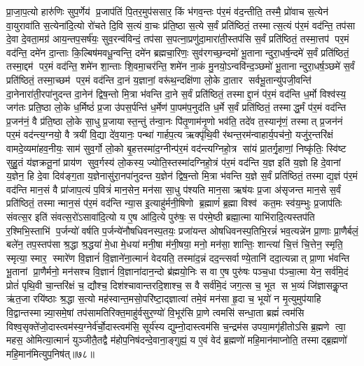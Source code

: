 प्रा॒जा॒प॒त्यो हारु॑णिः सुप॒र्णेय॑ प्र॒जाप॑तिं पि॒तर॒मुप॑ससार॒ किं भ॑गव॒न्तः प॑र॒मं व॑द॒न्तीति॒ तस्मै॒ प्रो॑वाच स॒त्येन॑ वा॒युरावा॑ति स॒त्येना॑दि॒त्यो रो॑चते दि॒वि स॒त्यं वा॒चः प्र॑ति॒ष्ठा स॒त्ये स॒र्वं प्रति॑ष्ठितं॒ तस्मात्स॒त्यं प॑र॒मं वद॑न्ति॒ तप॑सा दे॒वा दे॒वता॒मग्र॑ आय॒न्तप॒सर्\mbox{}ष॑यः॒ सुव॒रन्व॑विन्दं॒ तप॑सा स॒पत्ना॒प्रणु॑दा॒मारा॑ती॒स्तप॑सि स॒र्वं प्रति॑ष्ठितं॒ तस्मा॒त्तप॑ पर॒मं वद॑न्ति॒ दमे॑न दा॒न्ताः कि॒ल्बिष॑मवधू॒न्वन्ति॒ दमे॑न ब्रह्मचा॒रिणः॒ सुव॑रगच्छ॒न्दमो॑ भू॒तानान्दुरा॒धर्\mbox{}ष॒न्दमे॑ स॒र्वं प्रति॑ष्ठितं॒ तस्मा॒द्दम॑ पर॒मं वद॑न्ति॒ शमे॑न शा॒न्ताः  शि॒वमा॒चर॑न्ति॒ शमे॑न ना॒कं मु॒नयो॒ऽन्ववि॑न्द॒ञ्छमो॑ भू॒तानान्दुरा॒धर्\mbox{}ष॒ञ्छमे॑ स॒र्वं प्रति॑ष्ठितं॒ तस्मा॒च्छम॑ पर॒मं वद॑न्ति दा॒नं य॒ज्ञानां॒ वरू॑थ॒न्दक्षि॑णा लो॒के दा॒तार सर्वभू॒तान्यु॑पजी॒वन्ति॑ दा॒नेनारा॑ती॒रपा॑नुदन्त दा॒नेन॑ द्विष॒न्तो मि॒त्रा भ॑वन्ति दा॒ने स॒र्वं प्रति॑ष्ठितं॒ तस्माद्दा॒नं प॑र॒मं वद॑न्ति ध॒र्मो विश्व॑स्य॒ जग॑तः प्रति॒ष्ठा लो॒के ध॒र्मिष्ठं॑ प्र॒जा उ॑पस॒र्पन्ति॑ ध॒र्मेण॑ पा॒पम॑प॒नुद॑ति ध॒र्मे स॒र्वं प्रति॑ष्ठितं॒ तस्माद्ध॒र्मं प॑र॒मं वद॑न्ति प्र॒जन॑नं॒ वै प्र॑ति॒ष्ठा लो॒के सा॒धु प्र॒जायास्त॒न्तुं त॑न्वा॒नः पि॑तृ॒णाम॑नृ॒णो भव॑ति॒ तदे॑व त॒स्यानृ॑णं॒ तस्मात् प्र॒जन॑नं पर॒मं वद॑न्त्य॒ग्नयो॒ वै त्रयी॑ वि॒द्या दे॑व॒यानः॒ पन्था॑ गार्\mbox{}हप॒त्य ऋक्पृ॑थि॒वी र॑थन्त॒रम॑न्वाहार्य॒पच॑नो॒ यजु॑र॒न्तरि॑क्षं वामदे॒व्यमा॑हव॒नीयः॒ साम॑ सुव॒र्गो लो॒को बृ॒हत्तस्मा॑द॒ग्नीन्प॑र॒मं वद॑न्त्यग्निहो॒त्र सा॑यं प्रा॒तर्गृ॒हाणां॒ निष्कृ॑तिः॒ स्वि॑ष्ट सुहु॒तं य॑ज्ञक्रतू॒नां प्राय॑ण सुव॒र्गस्य॑ लो॒कस्य॒ ज्योति॒स्तस्मा॑दग्निहो॒त्रं प॑र॒मं वद॑न्ति य॒ज्ञ इति॑ य॒ज्ञो हि दे॒वानां य॒ज्ञेन॒ हि दे॒वा दिव॑ङ्ग॒ता य॒ज्ञेनासु॑रा॒नपा॑नुदन्त य॒ज्ञेन॑ द्विष॒न्तो मि॒त्रा भ॑वन्ति य॒ज्ञे स॒र्वं प्रति॑ष्ठितं॒ तस्माद्य॒ज्ञं प॑र॒मं वद॑न्ति मान॒सं वै प्रा॑जाप॒त्यं प॒वित्रं॑ मान॒सेन॒ मन॑सा सा॒धु प॑श्यति मान॒सा ऋष॑यः प्र॒जा अ॑सृजन्त मान॒से स॒र्वं प्रति॑ष्ठितं॒ तस्मान्मान॒सं प॑र॒मं वद॑न्ति न्या॒स इ॒त्याहु॑र्मनी॒षिणो ब्र॒ह्माणं॑ ब्र॒ह्मा विश्व॑ कत॒मः स्व॑य॒म्भुः प्र॒जाप॑तिः संवत्स॒र इति॑ संवत्स॒रो॑ऽसावा॑दि॒त्यो य ए॒ष आ॑दि॒त्ये पुरु॑षः॒ स प॑रमे॒ष्ठी ब्रह्मा॒त्मा याभि॑रादि॒त्यस्तप॑ति र॒श्मिभि॒स्ताभि॑ प॒र्जन्यो॑ वर्\mbox{}षति प॒र्जन्ये॑नौषधिवनस्प॒तयः॒ प्रजा॑यन्त ओषधिवनस्प॒तिभि॒रन्नं॑ भव॒त्यन्ने॑न प्रा॒णाः प्रा॒णैर्बलं॒ बले॑न॒ तप॒स्तप॑सा श्र॒द्धा श्र॒द्धया॑ मे॒धा मे॒धया॑ मनी॒षा म॑नी॒षया॒ मनो॒ मन॑सा॒ शान्तिः॒ शान्त्या॑ चि॒त्तं चि॒त्तेन॒ स्मृति॒ स्मृत्या॒ स्मार॒ स्मारे॑ण वि॒ज्ञानं॑  वि॒ज्ञाने॑ना॒त्मानं॑ वेदयति॒ तस्मा॑द॒न्नं दद॒न्त्सर्वाण्ये॒तानि॑ ददा॒त्यन्नात् प्रा॒णा भ॑वन्ति भू॒तानां प्रा॒णैर्मनो॒ मन॑सश्च वि॒ज्ञानं॑  वि॒ज्ञाना॑दान॒न्दो ब्र॑ह्मयो॒निः स वा ए॒ष पुरु॑षः पञ्च॒धा प॑ञ्चा॒त्मा येन॒ सर्व॑मि॒दं प्रोतं॑ पृथि॒वी चा॒न्तरि॑क्षं च॒ द्यौश्च॒ दिश॑श्चावान्तरदि॒शाश्च॒ स वै सर्व॑मि॒दं जग॒त्स च॒ भूत स भ॒व्यं जि॑ज्ञासकॢ॒प्त ऋ॑त॒जा रयि॑ष्ठाः  श्र॒द्धा स॒त्यो मह॑स्वान्त॒मसो॒परि॑ष्टा॒द्ज्ञात्वा॑ तमे॒वं मन॑सा हृ॒दा च॒ भूयो॑ न मृ॒त्युमुप॑याहि वि॒द्वान्तस्मान्न्या॒समे॒षां तप॑सामतिरिक्त॒माहु॑र्वसुर॒ण्यो॑ वि॒भूर॑सि प्रा॒णे त्वमसि॑ सन्धा॒ता ब्रह्मं॑ त्वम॑सि विश्व॒सृक्ते॑जो॒दास्त्वम॑स्य॒ग्नेर्व॑र्चो॒दास्त्वम॑सि॒ सूर्य॑स्य द्युम्नो॒दास्त्वम॑सि च॒न्द्रम॑स उपया॒मगृ॑हीतोऽसि ब्र॒ह्मणे त्वा॒ महस॒ ओमित्या॒त्मानं॑ युञ्जीतै॒तद्वै म॑होप॒निष॑दन्दे॒वाना॒ङ्गुह्यं॒ य ए॒वं वेद॑ ब्र॒ह्मणो॑ महि॒मान॑माप्नोति॒ तस्माद्ब्र॒ह्मणो॑ महि॒मान॑मित्युप॒निष॑त्॥७८॥
\anuvakamend



